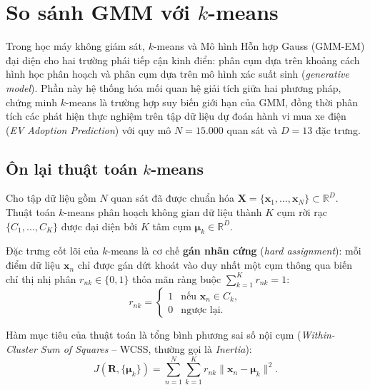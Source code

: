 


\section{So sánh GMM với \texorpdfstring{$k$}{k}-means}
\label{sec:kmeans_vs_gmm}

Trong học máy không giám sát, $k$-means và Mô hình Hỗn hợp Gauss (GMM-EM) đại diện cho hai trường phái tiếp cận kinh điển: phân cụm dựa trên khoảng cách hình học phân hoạch và phân cụm dựa trên mô hình xác suất sinh (\textit{generative model}). Phần này hệ thống hóa mối quan hệ giải tích giữa hai phương pháp, chứng minh $k$-means là trường hợp suy biến giới hạn của GMM, đồng thời phân tích các phát hiện thực nghiệm trên tập dữ liệu dự đoán hành vi mua xe điện (\textit{EV Adoption Prediction}) với quy mô $N = 15.000$ quan sát và $D = 13$ đặc trưng.

\subsection{Ôn lại thuật toán \texorpdfstring{$k$}{k}-means}

Cho tập dữ liệu gồm $N$ quan sát đã được chuẩn hóa $\mathbf{X} = \{\mathbf{x}_1, \dots, \mathbf{x}_N\} \subset \mathbb{R}^D$. Thuật toán $k$-means phân hoạch không gian dữ liệu thành $K$ cụm rời rạc $\{C_1, \dots, C_K\}$ được đại diện bởi $K$ tâm cụm $\boldsymbol{\mu}_k \in \mathbb{R}^D$. 

Đặc trưng cốt lõi của $k$-means là cơ chế \textbf{gán nhãn cứng} (\textit{hard assignment}): mỗi điểm dữ liệu $\mathbf{x}_n$ chỉ được gán dứt khoát vào duy nhất một cụm thông qua biến chỉ thị nhị phân $r_{nk} \in \{0, 1\}$ thỏa mãn ràng buộc $\sum_{k=1}^K r_{nk} = 1$:
\begin{equation}
    r_{nk} = \begin{cases}
        1 & \text{nếu } \mathbf{x}_n \in C_k, \\
        0 & \text{ngược lại.}
    \end{cases}
\end{equation}

Hàm mục tiêu của thuật toán là tổng bình phương sai số nội cụm (\textit{Within-Cluster Sum of Squares} -- WCSS, thường gọi là \textit{Inertia}):
\begin{equation}
    J(\mathbf{R}, \{\boldsymbol{\mu}_k\}) = \sum_{n=1}^N \sum_{k=1}^K r_{nk} \|\mathbf{x}_n - \boldsymbol{\mu}_k\|^2. \label{eq:wcss}
\end{equation}


